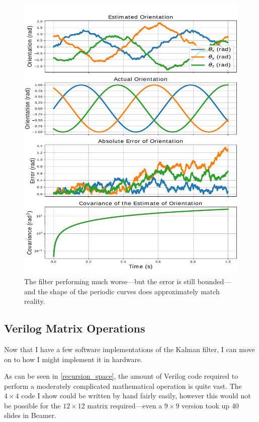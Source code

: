 \documentclass[12pt]{article}
\begin{document}
\begin{figure}[thp]
	\centering
	
	\includegraphics[width=\textwidth]{3d-orientation-noisy.pdf}
	
	\caption{The filter performing much worse---but the error is still bounded---and the shape of the periodic curves does approximately match reality.}
	\label{3d_noise_fig}
\end{figure}

\subsection{Verilog Matrix Operations}

Now that I have a few software implementations of the Kalman filter, I can move on to how I might implement it in hardware.

As can be seen in \ref{recursion_space}, the amount of Verilog code required to perform a moderately complicated mathematical operation is quite vast. The $4\times4$ code I show could be written by hand fairly easily, however this would not be possible for the $12\times12$ matrix required---even a $9\times9$ version took up 40 slides in Beamer.
\end{document}
